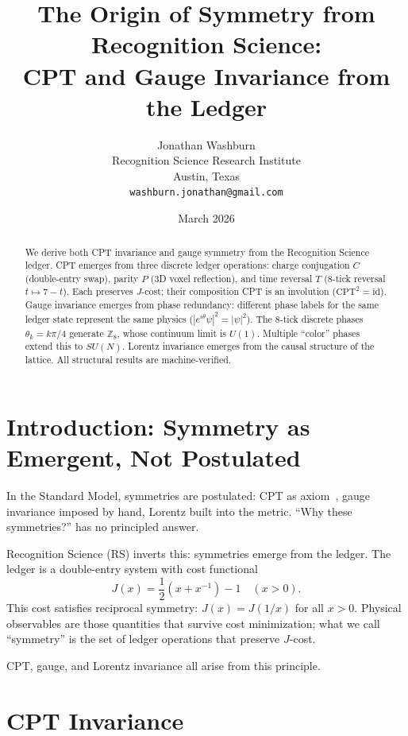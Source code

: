 \documentclass[12pt,a4paper]{article}
\title{The Origin of Symmetry from Recognition Science:\\
CPT and Gauge Invariance from the Ledger}
\author{Jonathan Washburn\\
Recognition Science Research Institute\\
Austin, Texas\\
\texttt{washburn.jonathan@gmail.com}}
\date{March 2026}
\theoremstyle{definition}
\theoremstyle{remark}
\begin{document}
\maketitle

\begin{abstract}
We derive both CPT invariance and gauge symmetry from the Recognition Science
ledger.  CPT emerges from three discrete ledger operations: charge conjugation
$C$ (double-entry swap), parity $P$ (3D voxel reflection), and time reversal
$T$ (8-tick reversal $t \mapsto 7 - t$).  Each preserves $J$-cost; their
composition CPT is an involution ($\mathrm{CPT}^2 = \mathrm{id}$).  Gauge
invariance emerges from phase redundancy: different phase labels for the same
ledger state represent the same physics ($|e^{i\theta}\psi|^2 = |\psi|^2$).  The
8-tick discrete phases $\theta_k = k\pi/4$ generate $\mathbb{Z}_8$, whose
continuum limit is $U(1)$.  Multiple ``color'' phases extend this to $SU(N)$.
Lorentz invariance emerges from the causal structure of the lattice.  All
structural results are machine-verified.
\end{abstract}

\section{Introduction: Symmetry as Emergent, Not Postulated}
\label{sec:intro}

In the Standard Model, symmetries are postulated: CPT as axiom~\cite{Streater},
gauge invariance imposed by hand, Lorentz built into the metric.  ``Why these
symmetries?'' has no principled answer.

Recognition Science (RS) inverts this: symmetries emerge from the ledger.  The
ledger is a double-entry system with cost functional
\begin{equation}
  J(x) = \frac{1}{2}(x + x^{-1}) - 1 \quad (x > 0).
\end{equation}
This cost satisfies reciprocal symmetry: $J(x) = J(1/x)$ for all $x > 0$.
Physical observables are those quantities that survive cost minimization; what
we call ``symmetry'' is the set of ledger operations that preserve $J$-cost.

CPT, gauge, and Lorentz invariance all arise from this principle.

\section{CPT Invariance}
\label{sec:cpt}
\end{document}
